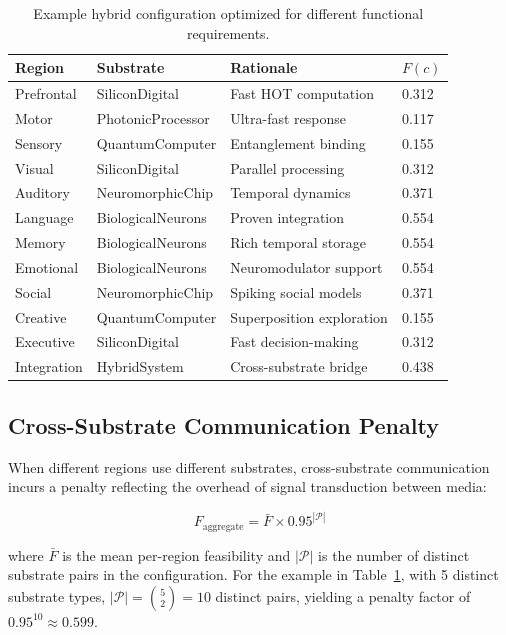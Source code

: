 \documentclass[12pt,a4paper]{article}
\begin{document}
\begin{table}[H]
\centering
\caption{Example hybrid configuration optimized for different functional requirements.}
\label{tab:hybrid}
\begin{tabular}{llll}
\toprule
\textbf{Region} & \textbf{Substrate} & \textbf{Rationale} & $F(c)$ \\
\midrule
Prefrontal & SiliconDigital & Fast HOT computation & 0.312 \\
Motor & PhotonicProcessor & Ultra-fast response & 0.117 \\
Sensory & QuantumComputer & Entanglement binding & 0.155 \\
Visual & SiliconDigital & Parallel processing & 0.312 \\
Auditory & NeuromorphicChip & Temporal dynamics & 0.371 \\
Language & BiologicalNeurons & Proven integration & 0.554 \\
Memory & BiologicalNeurons & Rich temporal storage & 0.554 \\
Emotional & BiologicalNeurons & Neuromodulator support & 0.554 \\
Social & NeuromorphicChip & Spiking social models & 0.371 \\
Creative & QuantumComputer & Superposition exploration & 0.155 \\
Executive & SiliconDigital & Fast decision-making & 0.312 \\
Integration & HybridSystem & Cross-substrate bridge & 0.438 \\
\bottomrule
\end{tabular}
\end{table}

\subsection{Cross-Substrate Communication Penalty}

When different regions use different substrates, cross-substrate communication incurs a penalty reflecting the overhead of signal transduction between media:

\begin{equation}
F_{\text{aggregate}} = \bar{F} \times 0.95^{|\mathcal{P}|}
\label{eq:penalty}
\end{equation}

where $\bar{F}$ is the mean per-region feasibility and $|\mathcal{P}|$ is the number of distinct substrate pairs in the configuration. For the example in Table~\ref{tab:hybrid}, with 5 distinct substrate types, $|\mathcal{P}| = \binom{5}{2} = 10$ distinct pairs, yielding a penalty factor of $0.95^{10} \approx 0.599$.
\end{document}
